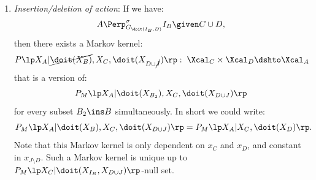 \begin{Cor}
\begin{enumerate}
            \[ A \Perp^\sigma_{G_{\doit(I_B,D)}} I_B \given B \cup C \cup D,   \]
            then there exists a Markov kernel:
            \[P\lp X_A|\cancel{\doit}(X_B),X_C,\doit(X_{D\cup \cancel{J}})\rp: \;\Xcal_B \times \Xcal_C \times \Xcal_{D} \dshto \Xcal_A\]
            that is a version of:            
            \[ P_{M}\lp X_A|X_{B_1},\doit(X_{B_2}),X_C,\doit(X_{D\cup J})\rp, \]
            for every decomposition $B=B_1\dcup B_2$ simultaneously. In short we could write:
            \[ P_{M}\lp X_A|\doit(X_B),X_C,\doit(X_D)\rp  =  P_{M}\lp X_A|X_B,X_C,\doit(X_D)\rp.\]
            since these Markov kernels are constant in $x_{J\setminus D}$.
            Such a Markov kernel is unique up to $P_{M}\lp X_B,X_C|\doit(X_{I_B},X_{D\cup J})\rp$-null sets.
         \item \emph{Insertion/deletion of action}: If we have:
            \[ A \Perp^\sigma_{G_{\doit(I_B,D)}} I_B \given C  \cup D,   \]
            then there exists a Markov kernel: 
            \[P\lp X_A|\cancel{\doit(X_B)},X_C,\doit(X_{D\cup \cancel{J}})\rp:\; \Xcal_C \times \Xcal_{D} \dshto \Xcal_A\] 
            that is a version of:  
            \[ P_{M}\lp X_A|\doit(X_{B_2}),X_C,\doit(X_{D\cup J})\rp\]
            for every subset $B_2 \ins B$ simultaneously. In short we could write:
            \[ P_{M}\lp X_A|\doit(X_B),X_C,\doit(X_{D\cup J})\rp = P_{M}\lp X_A|X_C,\doit(X_{D})\rp.\]
            Note that this Markov kernel is only dependent on $x_C$ and $x_{D}$, and constant in $x_{J\setminus D}$.
            Such a Markov kernel is unique up to $P_{M}\lp X_C|\doit(X_{I_B},X_{D\cup J})\rp$-null set.
    \end{enumerate}
\end{Cor}
